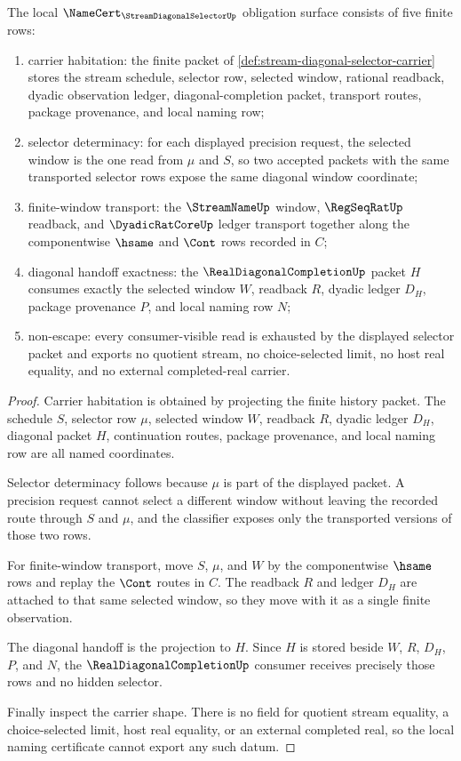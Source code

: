\begin{theorem}
\label{thm:stream-diagonal-selector-namecert-obligations}
The local $\NameCert_{\StreamDiagonalSelectorUp}$ obligation surface consists of five finite rows:
\begin{enumerate}
\item carrier habitation: the finite packet of \autoref{def:stream-diagonal-selector-carrier} stores the stream schedule, selector row, selected window, rational readback, dyadic observation ledger, diagonal-completion packet, transport routes, package provenance, and local naming row;
\item selector determinacy: for each displayed precision request, the selected window is the one read from $\mu$ and $S$, so two accepted packets with the same transported selector rows expose the same diagonal window coordinate;
\item finite-window transport: the $\StreamNameUp$ window, $\RegSeqRatUp$ readback, and $\DyadicRatCoreUp$ ledger transport together along the componentwise $\hsame$ and $\Cont$ rows recorded in $C$;
\item diagonal handoff exactness: the $\RealDiagonalCompletionUp$ packet $H$ consumes exactly the selected window $W$, readback $R$, dyadic ledger $D_H$, package provenance $P$, and local naming row $N$;
\item non-escape: every consumer-visible read is exhausted by the displayed selector packet and exports no quotient stream, no choice-selected limit, no host real equality, and no external completed-real carrier.
\end{enumerate}
\end{theorem}
\begin{proof}
Carrier habitation is obtained by projecting the finite history packet. The schedule $S$, selector row $\mu$, selected window $W$, readback $R$, dyadic ledger $D_H$, diagonal packet $H$, continuation routes, package provenance, and local naming row are all named coordinates.

Selector determinacy follows because $\mu$ is part of the displayed packet. A precision request cannot select a different window without leaving the recorded route through $S$ and $\mu$, and the classifier exposes only the transported versions of those two rows.

For finite-window transport, move $S$, $\mu$, and $W$ by the componentwise $\hsame$ rows and replay the $\Cont$ routes in $C$. The readback $R$ and ledger $D_H$ are attached to that same selected window, so they move with it as a single finite observation.

The diagonal handoff is the projection to $H$. Since $H$ is stored beside $W$, $R$, $D_H$, $P$, and $N$, the $\RealDiagonalCompletionUp$ consumer receives precisely those rows and no hidden selector.

Finally inspect the carrier shape. There is no field for quotient stream equality, a choice-selected limit, host real equality, or an external completed real, so the local naming certificate cannot export any such datum.
\end{proof}

